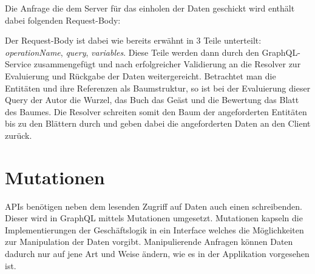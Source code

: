 Die Anfrage die dem Server für das einholen der Daten geschickt wird enthält dabei folgenden Request-Body:


Der Request-Body ist dabei wie bereits erwähnt in 3 Teile unterteilt: \textit{operationName}, \textit{query}, \textit{variables}.
Diese Teile werden dann durch den GraphQL-Service zusammengefügt und nach erfolgreicher Validierung an die Resolver zur Evaluierung und Rückgabe der Daten weitergereicht.
Betrachtet man die Entitäten und ihre Referenzen als Baumstruktur, so ist bei der Evaluierung dieser Query der Autor die Wurzel, das Buch das Geäst und die Bewertung das Blatt des Baumes.
Die Resolver schreiten somit den Baum der angeforderten Entitäten bis zu den Blättern durch und geben dabei die angeforderten Daten an den Client zurück.


\section{Mutationen}
APIs benötigen neben dem lesenden Zugriff auf Daten auch einen schreibenden.
Dieser wird in GraphQL mittels Mutationen umgesetzt.
Mutationen kapseln die Implementierungen der Geschäftslogik in ein Interface welches die Möglichkeiten zur Manipulation der Daten vorgibt.
Manipulierende Anfragen können Daten dadurch nur auf jene Art und Weise ändern, wie es in der Applikation vorgesehen ist.
\cite[S. 54]{kress2020graphql}

